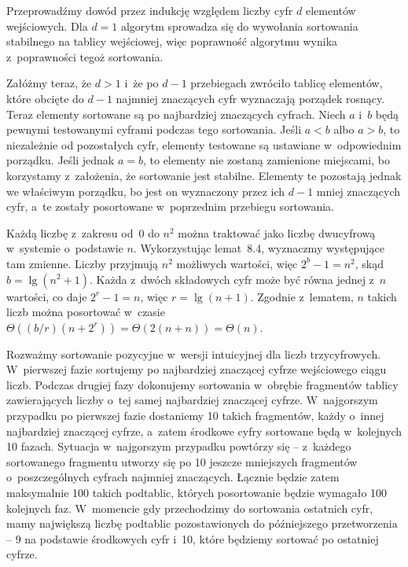 \exercise %
Przeprowadźmy dowód przez indukcję względem liczby cyfr $d$ elementów wejściowych. Dla $d=1$ algorytm sprowadza się do wywołania sortowania stabilnego na tablicy wejściowej, więc poprawność algorytmu wynika z~poprawności tegoż sortowania.

Załóżmy teraz, że $d>1$ i~że  po $d-1$ przebiegach zwróciło tablicę elementów, które obcięte do $d-1$ najmniej znaczących cyfr wyznaczają porządek rosnący. Teraz elementy sortowane są po  najbardziej znaczących cyfrach. Niech $a$ i~$b$ będą pewnymi testowanymi cyframi podczas tego sortowania. Jeśli $a<b$ albo $a>b$, to niezależnie od pozostałych cyfr, elementy testowane są ustawiane w~odpowiednim porządku. Jeśli jednak $a=b$, to elementy nie zostaną zamienione miejscami, bo korzystamy z~założenia, że sortowanie jest stabilne. Elementy te pozostają jednak we właściwym porządku, bo jest on wyznaczony przez ich $d-1$ mniej znaczących cyfr, a~te zostały posortowane w~poprzednim przebiegu sortowania.

\exercise %
Każdą liczbę z~zakresu od~0 do $n^2$ można traktować jako liczbę dwucyfrową w~systemie o~podstawie $n$. Wykorzystując lemat~8.4, wyznaczmy występujące tam zmienne. Liczby przyjmują $n^2$ możliwych wartości, więc $2^b-1=n^2$, skąd $b=\lg(n^2+1)$. Każda z~dwóch składowych cyfr może być równa jednej z~$n$ wartości, co daje $2^r-1=n$, więc $r=\lg(n+1)$. Zgodnie z~lematem, $n$ takich liczb można posortować w~czasie $\Theta((b/r)(n+2^r))=\Theta(2(n+n))=\Theta(n)$.

\exercise %
Rozważmy sortowanie pozycyjne w~wersji intuicyjnej dla liczb trzycyfrowych. W~pierwszej fazie sortujemy po najbardziej znaczącej cyfrze wejściowego ciągu liczb. Podczas drugiej fazy dokonujemy sortowania w~obrębie fragmentów tablicy zawierających liczby o~tej samej najbardziej znaczącej cyfrze. W~najgorszym przypadku po pierwszej fazie dostaniemy 10 takich fragmentów, każdy o~innej najbardziej znaczącej cyfrze, a~zatem środkowe cyfry sortowane będą w~kolejnych 10 fazach. Sytuacja w~najgorszym przypadku powtórzy się -- z~każdego sortowanego fragmentu utworzy się po 10 jeszcze mniejszych fragmentów o~poszczególnych cyfrach najmniej znaczących. Łącznie będzie zatem maksymalnie 100 takich podtablic, których posortowanie będzie wymagało 100 kolejnych faz. W~momencie gdy przechodzimy do sortowania ostatnich cyfr, mamy największą liczbę podtablic pozostawionych do późniejszego przetworzenia -- 9 na podstawie środkowych cyfr i~10, które będziemy sortować po ostatniej cyfrze.

